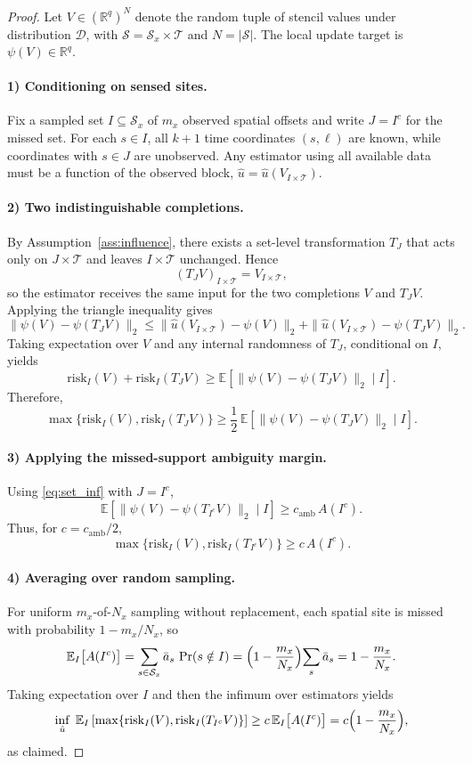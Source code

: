 \begin{proof}[Proof]
Let $V\in(\mathbb{R}^{q})^{N}$ denote the random tuple of stencil values under distribution $\mathcal{D}$, with $\mathcal{S}=\mathcal{S}_x\times\mathcal{T}$ and $N=|\mathcal{S}|$. The local update target is $\psi(V)\in\mathbb{R}^q$.

\paragraph{1) Conditioning on sensed sites.}
Fix a sampled set $I\subseteq\mathcal{S}_x$ of $m_x$ observed spatial offsets and write $J=I^c$ for the missed set. For each $s\in I$, all $k{+}1$ time coordinates $(s,\ell)$ are known, while coordinates with $s\in J$ are unobserved. Any estimator using all available data must be a function of the observed block, $\hat u=\hat u(V_{I\times\mathcal{T}})$.

\paragraph{2) Two indistinguishable completions.}
By Assumption~\ref{ass:influence}, there exists a set-level transformation $T_J$ that acts only on $J\times\mathcal{T}$ and leaves $I\times\mathcal{T}$ unchanged. Hence
\[
(T_JV)_{I\times\mathcal{T}}=V_{I\times\mathcal{T}},
\]
so the estimator receives the same input for the two completions $V$ and $T_JV$. Applying the triangle inequality gives
\[
\|\psi(V)-\psi(T_JV)\|_2
\le
\|\hat u(V_{I\times\mathcal{T}})-\psi(V)\|_2
+
\|\hat u(V_{I\times\mathcal{T}})-\psi(T_JV)\|_2.
\]
Taking expectation over $V$ and any internal randomness of $T_J$, conditional on $I$, yields
\[
\mathrm{risk}_I(V)+\mathrm{risk}_I(T_JV)
\ge
\mathbb{E}\!\left[
\|\psi(V)-\psi(T_JV)\|_2
\mid I
\right].
\]
Therefore,
\[
\max\{\mathrm{risk}_I(V),\mathrm{risk}_I(T_JV)\}
\ge
\frac12\,
\mathbb{E}\!\left[
\|\psi(V)-\psi(T_JV)\|_2
\mid I
\right].
\]

\paragraph{3) Applying the missed-support ambiguity margin.}
Using \eqref{eq:set_inf} with $J=I^c$,
\[
\mathbb{E}\!\left[
\|\psi(V)-\psi(T_{I^c}V)\|_2
\mid I
\right]
\ge
c_{\mathrm{amb}}\,A(I^c).
\]
Thus, for $c=c_{\mathrm{amb}}/2$,
\[
\max\{\mathrm{risk}_I(V),\mathrm{risk}_I(T_{I^c}V)\}
\ge
c\,A(I^c).
\]

\paragraph{4) Averaging over random sampling.}
For uniform $m_x$-of-$N_x$ sampling without replacement,
each spatial site is missed with probability $1-m_x/N_x$, so
\[
\mathbb{E}_I\bigl[A(I^c)\bigr]
= \sum_{s\in\mathcal{S}_x}\bar a_s\,\Pr(s\notin I)
= \Bigl(1-\frac{m_x}{N_x}\Bigr)\!\sum_s \bar a_s
= 1-\frac{m_x}{N_x}.
\]
Taking expectation over $I$ and then the infimum over estimators yields
\[
\inf_{\hat u}\;
\mathbb{E}_I
\left[
\max\{\mathrm{risk}_I(V),\mathrm{risk}_I(T_{I^c}V)\}
\right]
\ge c\,\mathbb{E}_I\bigl[A(I^c)\bigr]
= c\Bigl(1-\frac{m_x}{N_x}\Bigr),
\]
as claimed.
\end{proof}

